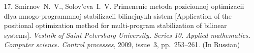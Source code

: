 {17. Smirnov~N.~V., Solov'eva~I.~V. Primenenie metoda pozicionnoj
optimizacii dlya mnogo-\linebreak programmnoj stabilizacii
bilinejnykh sistem [Application of the positional optimization
method for multi-\linebreak program stabilization of bilinear
systems]. \emph{Vestnik of Saint Petersburg University. Series 10.
Applied mathematics. Computer science. Control processes}, 2009,
issue~3, pp.~253--261. (In Russian)





}
